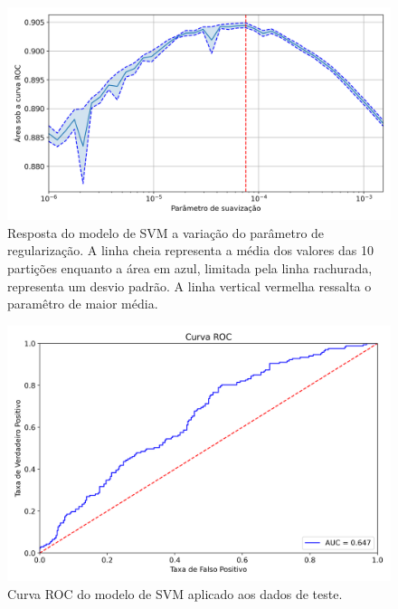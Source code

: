 \begin{figure}[h]
\begin{center} {
    \begin{center}
    \includegraphics[scale=0.65]{images/svm_grid.png}
    \caption{Resposta do modelo de SVM a variação do parâmetro de regularização.
             A linha cheia representa a média dos valores das 10 partições
             enquanto a área em azul, limitada pela linha rachurada, representa um desvio padrão.
             A linha vertical vermelha ressalta o paramêtro de maior média.}
    \label{fig:svm_grid}
    \end{center}
}
\end{center}
\end{figure}

\begin{figure}[h]
\begin{center} {
    \begin{center}
    \includegraphics[scale=0.65]{images/svm_roc.png}
    \caption{Curva ROC do modelo de SVM aplicado aos dados de teste.}
    \label{fig:svm_roc}
    \end{center}
}
\end{center}
\end{figure}

